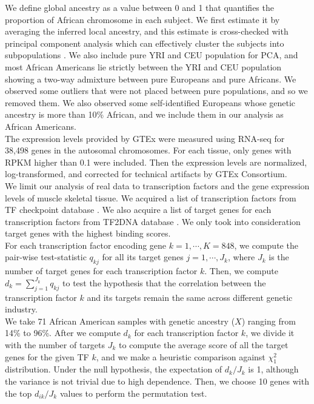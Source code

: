 \documentclass[aoas,preprint]{imsart}
\numberwithin{equation}{section}
\theoremstyle{plain}
\begin{document}
We define global ancestry as a value between 0 and 1 that quantifies the proportion of African chromosome in each subject. We first estimate it by averaging the inferred local ancestry, and this estimate is cross-checked with principal component analysis which can effectively cluster the subjects into subpopulations \cite{pritchard2000inference}. We also include pure YRI and CEU population for PCA, and most African Americans lie strictly between the YRI and CEU population showing a two-way admixture between pure Europeans and pure Africans. We observed some outliers that were not placed between pure populations, and so we removed them. We also observed some self-identified Europeans whose genetic ancestry is more than 10\% African, and we include them in our analysis as African Americans. \\

The expression levels provided by GTEx were measured using RNA-seq for 38,498 genes in the autosomal chromosomes. For each tissue, only genes with RPKM higher than 0.1 were included. Then the expression levels are normalized, log-transformed, and corrected for technical artifacts by GTEx Consortium. \\

We limit our analysis of real data to transcription factors and the gene expression levels of muscle skeletal tissue. We acquired a list of transcription factors from TF checkpoint database \cite{chawla2013tfcheckpoint}. We also acquire a list of target genes for each transcription factors from TF2DNA database \cite{pujato2014prediction}. We only took into consideration target genes with the highest binding scores. \\

For each transcription factor encoding gene $k = 1, \cdots, K = 848$, we compute the pair-wise test-statistic $q_{kj}$ for all its target genes $j = 1, \cdots, J_k$, where $J_k$ is the number of target genes for each transcription factor $k$. Then, we compute $d_k = \sum_{j=1}^{J_k} q_{kj}$ to test the hypothesis that the correlation between the transcription factor $k$ and its targets remain the same across different genetic industry. \\

We take 71 African American samples with genetic ancestry ($X$) ranging from 14\% to 96\%. After we compute $d_{k}$ for each transcription factor $k$, we divide it with the number of targets $J_k$ to compute the average score of all the target genes for the given TF $k$, and we make a heuristic comparison against $\chi_1^2$ distribution. Under the null hypothesis, the expectation of $d_k/J_k$ is 1, although the variance is not trivial due to high dependence. Then, we choose 10 genes with the top $d_{ik}/J_k$ values to perform the permutation test. \\
\end{document}
